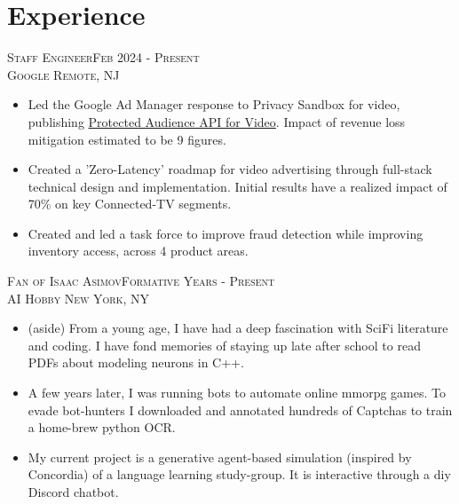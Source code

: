 \section{Experience}
\textsc{Staff Engineer\hfill Feb 2024 - Present\\}
\textsc{Google \hfill Remote, NJ\\}
\begin{itemize}
	\setlength{\itemsep}{1pt}
	\setlength{\parskip}{0pt}
	\setlength{\parsep}{0pt}
	\setlength{\leftmargin}{-5mm}
  \item Led the Google Ad Manager response to Privacy Sandbox for video, publishing
        \href{https://github.com/google/ads-privacy/tree/master/proposals/protected-audience-video}{Protected Audience API for Video}.
		Impact of revenue loss mitigation estimated to be 9 figures.
  \item Created a 'Zero-Latency' roadmap for video advertising through full-stack technical design and implementation. Initial results have a realized impact of
  		70\% on key Connected-TV segments.
  \item Created and led a task force to improve fraud detection while improving inventory access, across 4 product areas.
\end{itemize}
        

\textsc{Fan of Isaac Asimov\hfill Formative Years - Present\\}
\textsc{AI Hobby \hfill New York, NY\\}
\begin{itemize}
	\setlength{\itemsep}{1pt}
	\setlength{\parskip}{0pt}
	\setlength{\parsep}{0pt}
	\setlength{\leftmargin}{-5mm}

    \item (aside) From a young age, I have had a deep fascination with SciFi literature and coding. I have fond memories of staying up late after school to read PDFs about modeling neurons in C++.

    \item A few years later, I was running bots to automate online mmorpg games. To evade bot-hunters I downloaded and annotated hundreds of Captchas to train a home-brew python OCR.

    \item My current project is a generative agent-based simulation (inspired by Concordia) of a language learning study-group. It is interactive through a diy Discord chatbot.
\end{itemize}


